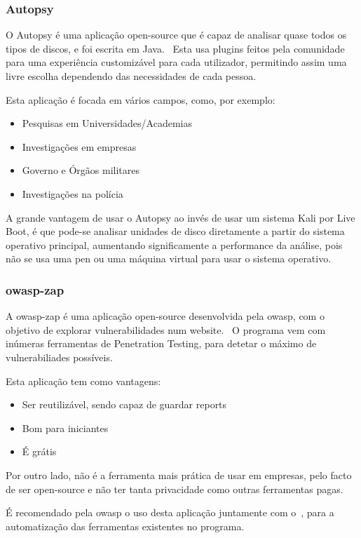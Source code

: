 \documentclass{report}
\begin{document}
\subsubsection{Autopsy}
\label{subsubsec:autopsy}
O Autopsy é uma aplicação open-source que é capaz de analisar quase todos os tipos de discos, e foi escrita em Java. \ Esta usa plugins feitos pela comunidade para uma experiência customizável para cada utilizador, permitindo assim uma livre escolha dependendo das necessidades de cada pessoa. \par
Esta aplicação é focada em vários campos, como, por exemplo:
\begin{itemize}
    \item Pesquisas em Universidades/Academias
    \item Investigações em empresas
    \item Governo e Órgãos militares
    \item Investigações na polícia
\end{itemize}
A grande vantagem de usar o Autopsy ao invés de usar um sistema Kali por Live Boot, é que pode-se analisar unidades de disco diretamente a partir do sistema operativo principal, aumentando significamente a performance da análise, pois não se usa uma pen ou uma máquina virtual para usar o sistema operativo.

\subsubsection{\ac{owasp-zap}}
\label{subsubsec:owasp-zap}
A \ac{owasp-zap} é uma aplicação open-source desenvolvida pela \ac{owasp}, com o objetivo de explorar vulnerabilidades num website. \ O programa vem com inúmeras ferramentas de Penetration Testing, para detetar o máximo de vulnerabiliades possíveis. \par
Esta aplicação tem como vantagens:
\begin{itemize}
    \item Ser reutilizável, sendo capaz de guardar reports
    \item Bom para iniciantes
    \item É grátis
\end{itemize}
Por outro lado, não é a ferramenta mais prática de usar em empresas, pelo facto de ser open-source e não ter tanta privacidade como outras ferramentas pagas. \par
É recomendado pela \ac{owasp} o uso desta aplicação juntamente com o~, para a automatização das ferramentas existentes no programa. \bigskip
\end{document}
